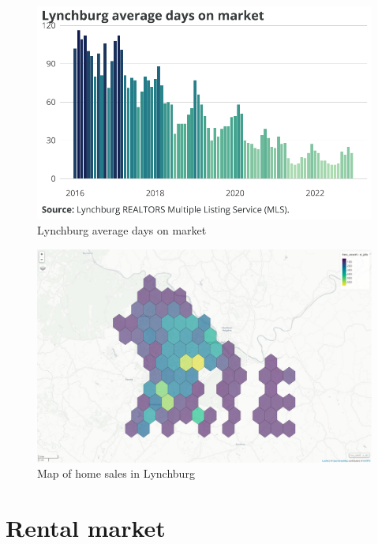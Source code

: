 \documentclass[
  letterpaper,
  DIV=11,
  numbers=noendperiod]{scrreprt}
\begin{document}
\begin{figure}[H]

{\centering \includegraphics{./part-3-3_files/figure-pdf/fig-dom-1.pdf}

}

\caption{\label{fig-dom}Lynchburg average days on market}

\end{figure}

\begin{figure}[H]

{\centering \includegraphics{./part-3-3_files/figure-pdf/fig-lburg_sales-1.pdf}

}

\caption{\label{fig-lburg_sales}Map of home sales in Lynchburg}

\end{figure}

\hypertarget{rental-market-2}{%
\section{Rental market}\label{rental-market-2}}
\end{document}
